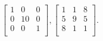$$
\left[
\begin{array}{*{3}{r}}
1 & 0 & 0\\
0 & 10 & 0\\
0 & 0 & 1\\
\end{array}
\right]
, 
\left[
\begin{array}{*{3}{r}}
1 & 1 & 8\\
5 & 9 & 5\\
8 & 1 & 1\\
\end{array}
\right].
$$
